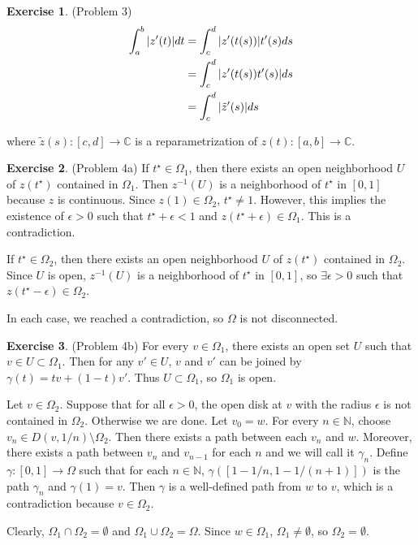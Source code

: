 \documentclass[12pt, psamsfonts]{amsart}
\theoremstyle{definition}
\newtheorem*{exer}{Exercise}
\theoremstyle{remark}
\numberwithin{equation}{section}
\begin{document}
\begin{exer}{(Problem 3)}
  \begin{align*}
    \int_a^b \abs{z'(t)} dt
      &= \int_c^d \abs{z'(t(s))}t'(s) ds \\
      &= \int_c^d \abs{z'(t(s))t'(s)} ds \\
      &= \int_c^d \abs{\tilde{z}'(s)} ds
  \end{align*}
  
  where $\tilde{z}(s): [c, d] \rightarrow \mathbb{C}$ is a reparametrization of $z(t): [a, b] \rightarrow \mathbb{C}$.
\end{exer}

\begin{exer}{(Problem 4a)}
  If $t^{\star} \in \Omega_1$, then there exists an open neighborhood $U$ of $z(t^{\star})$ contained in $\Omega_1$.
  Then $z^{-1}(U)$ is a neighborhood of $t^{\star}$ in $[0, 1]$ because $z$ is continuous.
  Since $z(1) \in \Omega_2$, $t^{\star} \ne 1$.
  However, this implies the existence of $\epsilon > 0$ such that $t^{\star} + \epsilon < 1$ and $z(t^{\star} + \epsilon) \in \Omega_1$.
  This is a contradiction.

  If $t^{\star} \in \Omega_2$, then there exists an open neighborhood $U$ of $z(t^{\star})$ contained in $\Omega_2$.
  Since $U$ is open, $z^{-1}(U)$ is a neighborhood of $t^{\star}$ in $[0, 1]$, so $\exists \epsilon > 0$ such that $z(t^{\star} - \epsilon) \in \Omega_2$.

  In each case, we reached a contradiction, so $\Omega$ is not disconnected.
\end{exer}

\begin{exer}{(Problem 4b)}
  For every $v \in \Omega_1$, there exists an open set $U$ such that $v \in U \subset \Omega_1$.
  Then for any $v' \in U$, $v$ and $v'$ can be joined by $\gamma(t) = tv + (1 - t)v'$.
  Thus $U \subset \Omega_1$, so $\Omega_1$ is open.

  Let $v \in \Omega_2$.
  Suppose that for all $\epsilon > 0$, the open disk at $v$ with the radius $\epsilon$ is not contained in $\Omega_2$.
  Otherwise we are done.
  Let $v_0 = w$.
  For every $n \in \mathbb{N}$, choose $v_n \in D(v, 1/n) \setminus \Omega_2$.
  Then there exists a path between each $v_n$ and $w$.
  Moreover, there exists a path between $v_n$ and $v_{n - 1}$ for each $n$ and we will call it $\gamma_n$.
  Define $\gamma: [0, 1] \rightarrow \Omega$ such that for each $n \in \mathbb{N}$, $\gamma([1 - 1/n, 1 - 1/(n+1)])$ is the path $\gamma_n$ and $\gamma(1) = v$.
  Then $\gamma$ is a well-defined path from $w$ to $v$, which is a contradiction because $v \in \Omega_2$.

  Clearly, $\Omega_1 \cap \Omega_2 = \emptyset$ and $\Omega_1 \cup \Omega_2 = \Omega$.
  Since $w \in \Omega_1$, $\Omega_1 \ne \emptyset$, so $\Omega_2 = \emptyset$.
\end{exer}
\end{document}
